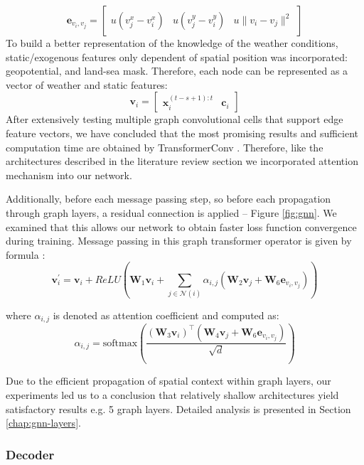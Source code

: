  \renewcommand{\arraystretch}{1}
\[
    \mathbf{e}_{v_i,v_j} =
    \begin{bmatrix}
        u(v_j^x - v_{i}^x) & u(v_j^y - v_i^y) & u\|v_{i}-v_{j}\|^2
    \end{bmatrix}
\]
To build a better representation of the knowledge of the weather conditions, static/exogenous features only dependent of spatial position was incorporated: geopotential, and land-sea mask. Therefore, each node can be represented as a vector of weather and static features:
\[
    \mathbf{v}_i = \begin{bmatrix}
        \mathbf{x}_i^{(t-s+1):t} & \mathbf{c}_i
    \end{bmatrix}
\]
After extensively testing multiple graph convolutional cells that support edge feature vectors, we have concluded that the most promising results and sufficient computation time are obtained by TransformerConv \cite{dwivedi2021generalization} \cite{shi2021masked}. Therefore, like the architectures described in the literature review section we incorporated attention mechanism into our network.

Additionally, before each message passing step, so before each propagation through graph layers, a residual connection is applied -- Figure \ref{fig:gnn}. We examined that this allows our network to obtain faster loss function convergence during training. Message passing in this graph transformer operator is given by formula \cite{torch_geometric_transformerconv}:
\[
    \mathbf{v}^{\prime}_i = \mathbf{v}_i + ReLU(\mathbf{W}_1 \mathbf{v}_i +
    \sum_{j \in \mathcal{N}(i)} \alpha_{i,j} \left(
    \mathbf{W}_2 \mathbf{v}_{j} + \mathbf{W}_6 \mathbf{e}_{v_i, v_j}
    \right))
\]

where $\alpha_{i,j}$ is denoted as attention coefficient and computed as:
\[
    \alpha_{i,j} = \textrm{softmax} \left(
    \frac{(\mathbf{W}_3\mathbf{v}_i)^{\top}
    (\mathbf{W}_4\mathbf{v}_j + \mathbf{W}_6 \mathbf{e}_{v_i, v_j})}
    {\sqrt{d}} \right)
\]

Due to the efficient propagation of spatial context within graph layers, our experiments led us to a conclusion that relatively shallow architectures yield satisfactory results e.g. 5 graph layers. Detailed analysis is presented in Section \ref{chap:gnn-layers}.


\subsubsection{Decoder}

